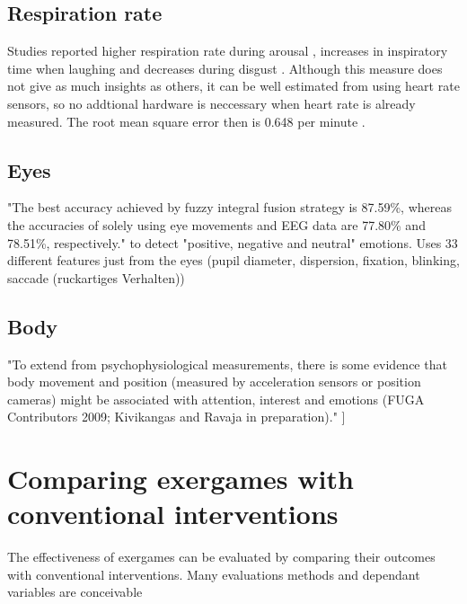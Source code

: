 \subsection{Respiration rate}
Studies reported higher respiration rate during arousal \cite{homma2008breathing}, increases in inspiratory time when laughing and decreases during disgust \cite{boiten1998effects}. Although this measure does not give as much insights as others, it can be well estimated from using heart rate sensors, so no addtional hardware is neccessary when heart rate is already measured. The root mean square error then is 0.648 per minute \cite{natarajan2021measurement}.

\subsection{Eyes}
"The best accuracy achieved by fuzzy integral fusion strategy is 87.59\%, whereas the accuracies of solely using eye movements and EEG data are 77.80\% and 78.51\%, respectively." to detect "positive, negative and neutral" emotions. Uses 33 different features just from the eyes (pupil diameter, dispersion, fixation, blinking, saccade (ruckartiges Verhalten))\cite{lu15combining}

\subsection{Body}
"To extend from psychophysiological measurements, there is some evidence that body movement and position (measured by acceleration sensors or position cameras) might be associated with
attention, interest and emotions (FUGA Contributors 2009; Kivikangas and
Ravaja in preparation)." \cite{kivikangas2011review}
]
\section{Comparing exergames with conventional interventions}

The effectiveness of exergames can be evaluated by comparing their outcomes with conventional interventions. Many evaluations methods and dependant variables are conceivable 

